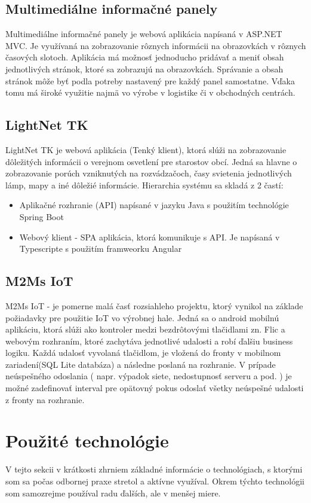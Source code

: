 \documentclass[11pt, oneside]{report}
\begin{document}
\section{Multimediálne informačné panely}
Multimediálne informačné panely\cite{panely} je webová aplikácia napísaná v ASP.NET  MVC. Je využívaná na zobrazovanie rôznych  informácii na obrazovkách v rôznych časových slotoch. Aplikácia má  možnosť  jednoducho pridávať a meniť obsah  jednotlivých stránok, ktoré sa zobrazujú na obrazovkách.  Správanie a obsah stránok môže byť podla potreby nastavený pre každý panel samostatne. Vďaka tomu má široké využitie najmä  vo výrobe v logistike či v obchodných centrách.
\section{LightNet TK}
LightNet TK je webová aplikácia (Tenký klient), ktorá slúži na zobrazovanie dôležitých informácii o verejnom osvetlení pre starostov obcí. Jedná sa hlavne o zobrazovanie porúch vzniknutých na rozvádzačoch, časy svietenia jednotlivých lámp, mapy a iné dôležié informácie. Hierarchia systému sa  skladá z 2 častí:
\begin{itemize}
\item Aplikačné rozhranie (API) napísané v jazyku Java s použitím technológie Spring Boot
\item Webový klient - SPA aplikácia, ktorá komunikuje s API. Je napísaná v Typescripte s použitím framweorku Angular
\end{itemize} 

\section{M2Ms IoT}
M2Ms IoT - je pomerne malá časť rozsiahleho projektu, ktorý vynikol na základe požiadavky pre použitie IoT vo výrobnej hale. Jedná sa o android mobilnú aplikáciu, ktorá slúži ako kontroler medzi bezdrôtovými tlačidlami zn. Flic\cite{flic} a webovým rozhraním, ktoré zachytáva jednotlivé udalosti a robí ďalšiu business logiku. Každá udalosť vyvolaná tlačidlom, je vložená do fronty v mobilnom zariadení(SQL Lite databáza)  a následne poslaná na rozhranie. V prípade neúspešného odoslania ( napr. výpadok siete, nedostupnosť serveru a pod. )   je možné zadefinovať interval pre  opätovný pokus odoslať všetky neúspešné udalosti z fronty na rozhranie.

\chapter{Použité technológie}
V tejto sekcii v krátkosti zhrniem základné informácie o technológiach, s ktorými som sa počas odbornej praxe stretol a aktívne využíval. Okrem týchto  technológii som samozrejme používal radu ďalších, ale v menšej miere.
\end{document}
